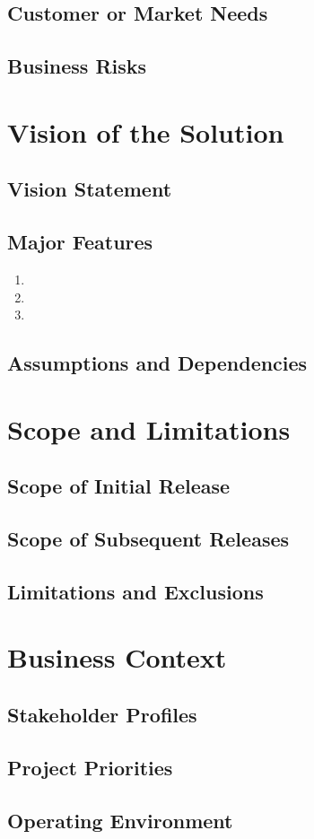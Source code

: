 \documentclass[12pt]{article}
\begin{document}
\subsection{Customer or Market Needs}

\subsection{Business Risks}


\section{Vision of the Solution}

\subsection{Vision Statement}

\subsection{Major Features}
\begin{enumerate}
\item 
\item
\item
\end{enumerate}

\subsection{Assumptions and Dependencies}
 

\section{Scope and Limitations}

\subsection{Scope of Initial Release}

\subsection{Scope of Subsequent Releases}

\subsection{Limitations and Exclusions}


\section{Business Context}

\subsection{Stakeholder Profiles}

\subsection{Project Priorities}

\subsection{Operating Environment}
\end{document}
